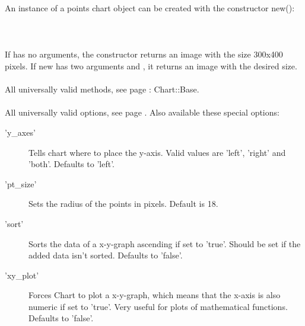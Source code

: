  An instance of a points chart object can be created with the constructor new():\\
\\
\\
\\
If  has no arguments, the constructor returns an image with the size 300x400 pixels. If new has two arguments  and , it returns an image with the desired size. \\ 
\\ 
All universally valid methods, see page \pageref{methods}: Chart::Base. \\
\\
 All universally valid options, see page \pageref{options}. Also available these special options:
\begin{description}
\item['y\_axes'] Tells chart where to place the y-axis. Valid values are 'left', 'right' and 'both'. Defaults to 'left'.
\item['pt\_size']Sets the radius of the points in pixels. Default is 18.
\item['sort']Sorts the data of a x-y-graph ascending if set to 'true'. Should be set if the added data isn't sorted. Defaults to 'false'.
\item['xy\_plot']Forces Chart to plot a x-y-graph, which means that the x-axis is also numeric if set to 'true'. Very useful for plots of mathematical functions. Defaults to 'false'.
\end{description}